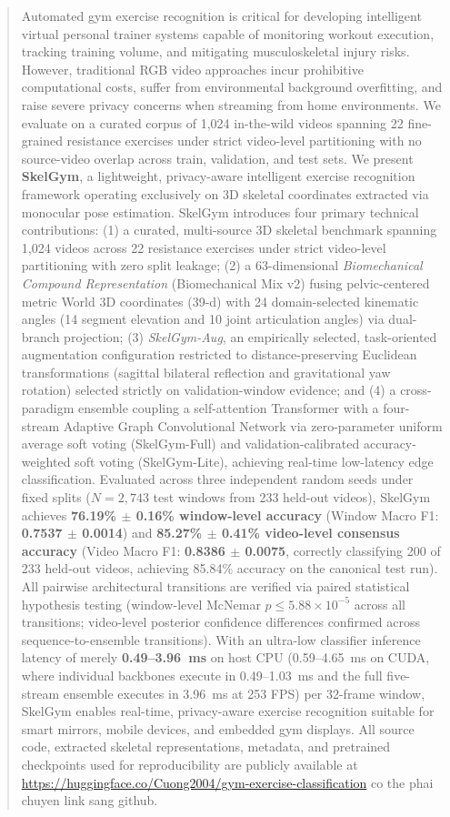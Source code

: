 \documentclass[preprint,12pt]{elsarticle}
\newcommand{\rv}[1]{{\color{red}#1}}
\begin{document}
\begin{frontmatter}
\begin{abstract}
Automated gym exercise recognition is critical for developing intelligent virtual personal trainer systems capable of monitoring workout execution, tracking training volume, and mitigating musculoskeletal injury risks. However, traditional RGB video approaches incur prohibitive computational costs, suffer from environmental background overfitting, and raise severe privacy concerns when streaming from home environments. We evaluate on a curated corpus of 1,024 in-the-wild videos spanning 22 fine-grained resistance exercises under strict video-level partitioning with no source-video overlap across train, validation, and test sets. We present \textbf{SkelGym}, a lightweight, privacy-aware intelligent exercise recognition framework operating exclusively on 3D skeletal coordinates extracted via monocular pose estimation. SkelGym introduces four primary technical contributions: (1) a curated, multi-source 3D skeletal benchmark spanning 1,024 videos across 22 resistance exercises under strict video-level partitioning with zero split leakage; (2) a 63-dimensional \textit{Biomechanical Compound Representation} (Biomechanical Mix v2) fusing pelvic-centered metric World 3D coordinates (39-d) with 24 domain-selected kinematic angles (14 segment elevation and 10 joint articulation angles) via dual-branch projection; (3) \textit{SkelGym-Aug}, an empirically selected, task-oriented augmentation configuration restricted to distance-preserving Euclidean transformations (sagittal bilateral reflection and gravitational yaw rotation) selected strictly on validation-window evidence; and (4) a cross-paradigm ensemble coupling a self-attention Transformer with a four-stream Adaptive Graph Convolutional Network via zero-parameter uniform average soft voting (SkelGym-Full) and validation-calibrated accuracy-weighted soft voting (SkelGym-Lite), achieving real-time low-latency edge classification. Evaluated across three independent random seeds under fixed splits ($N=2,743$ test windows from 233 held-out videos), SkelGym achieves \textbf{76.19\% $\pm$ 0.16\% window-level accuracy} (Window Macro F1: \textbf{0.7537 $\pm$ 0.0014}) and \textbf{85.27\% $\pm$ 0.41\% video-level consensus accuracy} (Video Macro F1: \textbf{0.8386 $\pm$ 0.0075}, correctly classifying 200 of 233 held-out videos, achieving 85.84\% accuracy on the canonical test run). All pairwise architectural transitions are verified via paired statistical hypothesis testing (window-level McNemar $p \le 5.88 \times 10^{-5}$ across all transitions; video-level posterior confidence differences confirmed across sequence-to-ensemble transitions). With an ultra-low classifier inference latency of merely \textbf{0.49--3.96~ms} on host CPU (0.59--4.65~ms on CUDA, where individual backbones execute in 0.49--1.03~ms and the full five-stream ensemble executes in 3.96~ms at 253 FPS) per 32-frame window, SkelGym enables real-time, privacy-aware exercise recognition suitable for smart mirrors, mobile devices, and embedded gym displays. All source code, extracted skeletal representations, metadata, and pretrained checkpoints used for reproducibility are publicly available at \url{https://huggingface.co/Cuong2004/gym-exercise-classification} \rv{co the phai chuyen link sang github}.

\end{abstract}
\end{frontmatter}
\end{document}
